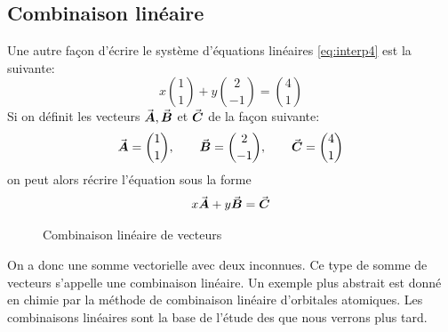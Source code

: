 %
\subsection{Combinaison linéaire}
%
Une autre façon d'écrire le système d'équations linéaires \eqref{eq:interp4} est la suivante:
\[
x \binom{1}{1}+ y\binom{2}{-1} = \binom{4}{1}
\]
Si on définit les vecteurs $\vec{\boldsymbol{A}}, \vec{\boldsymbol{B}}$ et $\vec{\boldsymbol{C}}$ de la façon suivante:
\[
\vec{\boldsymbol{A}}= \binom{1}{1}, \qquad \vec{\boldsymbol{B}}=\binom{2}{-1}, \qquad \vec{\boldsymbol{C}} = \binom{4}{1}
\]
on peut alors récrire l'équation sous la forme
\[
x\vec{\boldsymbol{A}} + y\vec{\boldsymbol{B}} = \vec{\boldsymbol{C}}
\]

\begin{figure}[h]
\begin{center}
\caption{Combinaison linéaire de vecteurs}
\end{center}
\end{figure}

On a donc une somme vectorielle avec deux inconnues.  
Ce type de somme de vecteurs s'appelle une combinaison linéaire.
Un exemple plus abstrait est donné en chimie par la méthode de combinaison linéaire d'orbitales atomiques.
Les combinaisons linéaires sont la base de l'étude des  que nous verrons plus tard.

